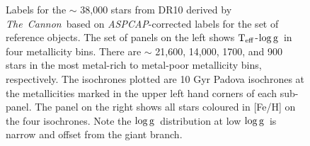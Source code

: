 \documentclass[12pt, preprint]{aastex}
\newcommand{\teff}{\mbox{$\rm T_{eff}$}}
\newcommand{\logg}{\mbox{$\rm \log g$}}
\newcommand{\tc}{\textsl{The~Cannon}}
\newcommand{\aspcap}{\textsl{ASPCAP}}
\begin{document}
\begin{figure}[!h]
\caption{Labels for the $\sim$ 38,000 stars from DR10 derived by \tc\ based on \aspcap-corrected labels for the set of reference objects. The set of panels on the left shows \teff-\logg\ in four metallicity bins. There are $\sim$ 21,600, 14,000, 1700, and 900 stars in the most metal-rich to metal-poor metallicity bins, respectively. The isochrones plotted are 10 Gyr Padova isochrones at the metallicities marked in the upper left hand corners of each sub-panel.  The panel on the right shows all stars coloured in [Fe/H] on the four isochrones. Note the \logg\ distribution at low \logg\ is narrow and offset from the giant branch. }
\label{fig:iso}
\end{figure}


\begin{figure}[!h]
\centering


\end{figure}
\end{document}
